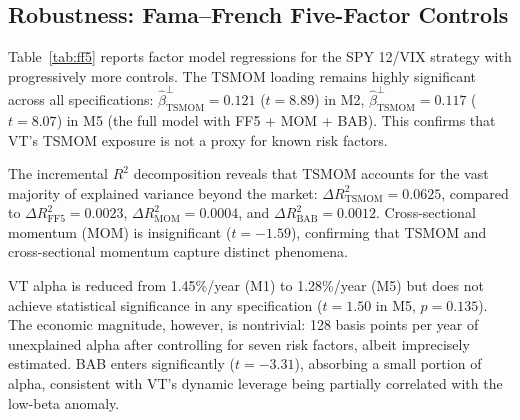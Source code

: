 \subsection{Robustness: Fama--French Five-Factor Controls}

Table~\ref{tab:ff5} reports factor model regressions for the SPY 12/VIX strategy with progressively more controls. The TSMOM loading remains highly significant across all specifications: $\hat{\beta}_{\text{TSMOM}}^{\perp} = 0.121$ ($t = 8.89$) in M2, $\hat{\beta}_{\text{TSMOM}}^{\perp} = 0.117$ ($t = 8.07$) in M5 (the full model with FF5 + MOM + BAB). This confirms that VT's TSMOM exposure is not a proxy for known risk factors.

The incremental $R^2$ decomposition reveals that TSMOM accounts for the vast majority of explained variance beyond the market: $\Delta R^2_{\text{TSMOM}} = 0.0625$, compared to $\Delta R^2_{\text{FF5}} = 0.0023$, $\Delta R^2_{\text{MOM}} = 0.0004$, and $\Delta R^2_{\text{BAB}} = 0.0012$. Cross-sectional momentum (MOM) is insignificant ($t = -1.59$), confirming that TSMOM and cross-sectional momentum capture distinct phenomena.

VT alpha is reduced from 1.45\%/year (M1) to 1.28\%/year (M5) but does not achieve statistical significance in any specification ($t = 1.50$ in M5, $p = 0.135$). The economic magnitude, however, is nontrivial: 128 basis points per year of unexplained alpha after controlling for seven risk factors, albeit imprecisely estimated. BAB enters significantly ($t = -3.31$), absorbing a small portion of alpha, consistent with VT's dynamic leverage being partially correlated with the low-beta anomaly.

